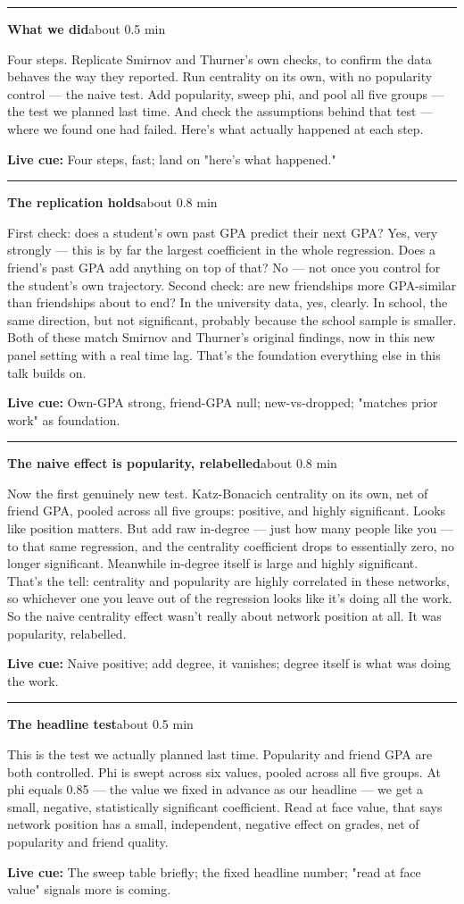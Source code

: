 \documentclass[11pt]{article}
\newcommand{\Cue}[1]{\par\nobreak\smallskip\noindent\textcolor{ScriptGray}{\footnotesize
  \textbf{Live cue:} #1}\par}
\newcommand{\scriptframe}[3]{%
  \Needspace{9\baselineskip}%
  \par\medskip\noindent\textcolor{ScriptBlue}{\rule{\linewidth}{0.55pt}}%
  \par\smallskip\noindent
  \textbf{#1}\hfill\textcolor{ScriptGray}{\small #2}\par\smallskip
  #3\par}
\begin{document}
\scriptframe{What we did}{about 0.5 min}{%
  Four steps. Replicate Smirnov and Thurner's own checks, to confirm the data
  behaves the way they reported. Run centrality on its own, with no
  popularity control --- the naive test. Add popularity, sweep phi, and pool
  all five groups --- the test we planned last time. And check the
  assumptions behind that test --- where we found one had failed. Here's what
  actually happened at each step.
  \Cue{Four steps, fast; land on "here's what happened."}
}

\scriptframe{The replication holds}{about 0.8 min}{%
  First check: does a student's own past GPA predict their next GPA? Yes,
  very strongly --- this is by far the largest coefficient in the whole
  regression. Does a friend's past GPA add anything on top of that? No ---
  not once you control for the student's own trajectory. Second check: are
  new friendships more GPA-similar than friendships about to end? In the
  university data, yes, clearly. In school, the same direction, but not
  significant, probably because the school sample is smaller. Both of these
  match Smirnov and Thurner's original findings, now in this new panel
  setting with a real time lag. That's the foundation everything else in
  this talk builds on.
  \Cue{Own-GPA strong, friend-GPA null; new-vs-dropped; "matches prior work" as foundation.}
}

\scriptframe{The naive effect is popularity, relabelled}{about 0.8 min}{%
  Now the first genuinely new test. Katz-Bonacich centrality on its own, net
  of friend GPA, pooled across all five groups: positive, and highly
  significant. Looks like position matters. But add raw in-degree --- just
  how many people like you --- to that same regression, and the centrality
  coefficient drops to essentially zero, no longer significant. Meanwhile
  in-degree itself is large and highly significant. That's the tell: centrality
  and popularity are highly correlated in these networks, so whichever one
  you leave out of the regression looks like it's doing all the work. So the
  naive centrality effect wasn't really about network position at all. It
  was popularity, relabelled.
  \Cue{Naive positive; add degree, it vanishes; degree itself is what was doing the work.}
}

\scriptframe{The headline test}{about 0.5 min}{%
  This is the test we actually planned last time. Popularity and friend GPA
  are both controlled. Phi is swept across six values, pooled across all
  five groups. At phi equals 0.85 --- the value we fixed in advance as our
  headline --- we get a small, negative, statistically significant
  coefficient. Read at face value, that says network position has a small,
  independent, negative effect on grades, net of popularity and friend
  quality.
  \Cue{The sweep table briefly; the fixed headline number; "read at face value" signals more is coming.}
}
\end{document}
